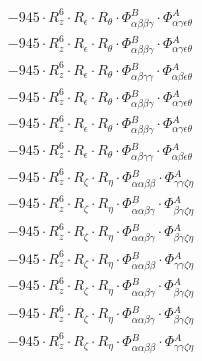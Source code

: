 \documentclass{article}
\begin{document}
\begin{subequations}
\begin{gather}
\begin{array}{c}
 \\[0.2em] 		 - 945 \cdot R_{z}^{6} \cdot R_{\epsilon{}} \cdot R_{\theta{}} \cdot \Phi{}^{B}_{\alpha{}\beta{}\beta{}\gamma{}} \cdot \Phi{}^{A}_{\alpha{}\gamma{}\epsilon{}\theta{}} 
 \\[0.2em] 		 - 945 \cdot R_{z}^{6} \cdot R_{\epsilon{}} \cdot R_{\theta{}} \cdot \Phi{}^{B}_{\alpha{}\beta{}\beta{}\gamma{}} \cdot \Phi{}^{A}_{\alpha{}\gamma{}\epsilon{}\theta{}} 
 \\[0.2em] 		 - 945 \cdot R_{z}^{6} \cdot R_{\epsilon{}} \cdot R_{\theta{}} \cdot \Phi{}^{B}_{\alpha{}\beta{}\gamma{}\gamma{}} \cdot \Phi{}^{A}_{\alpha{}\beta{}\epsilon{}\theta{}} 
 \\[0.2em] 		 - 945 \cdot R_{z}^{6} \cdot R_{\epsilon{}} \cdot R_{\theta{}} \cdot \Phi{}^{B}_{\alpha{}\beta{}\beta{}\gamma{}} \cdot \Phi{}^{A}_{\alpha{}\gamma{}\epsilon{}\theta{}} 
 \\[0.2em] 		 - 945 \cdot R_{z}^{6} \cdot R_{\epsilon{}} \cdot R_{\theta{}} \cdot \Phi{}^{B}_{\alpha{}\beta{}\beta{}\gamma{}} \cdot \Phi{}^{A}_{\alpha{}\gamma{}\epsilon{}\theta{}} 
 \\[0.2em] 		 - 945 \cdot R_{z}^{6} \cdot R_{\epsilon{}} \cdot R_{\theta{}} \cdot \Phi{}^{B}_{\alpha{}\beta{}\gamma{}\gamma{}} \cdot \Phi{}^{A}_{\alpha{}\beta{}\epsilon{}\theta{}} 
 \\[0.2em] 		 - 945 \cdot R_{z}^{6} \cdot R_{\zeta{}} \cdot R_{\eta{}} \cdot \Phi{}^{B}_{\alpha{}\alpha{}\beta{}\beta{}} \cdot \Phi{}^{A}_{\gamma{}\gamma{}\zeta{}\eta{}} 
 \\[0.2em] 		 - 945 \cdot R_{z}^{6} \cdot R_{\zeta{}} \cdot R_{\eta{}} \cdot \Phi{}^{B}_{\alpha{}\alpha{}\beta{}\gamma{}} \cdot \Phi{}^{A}_{\beta{}\gamma{}\zeta{}\eta{}} 
 \\[0.2em] 		 - 945 \cdot R_{z}^{6} \cdot R_{\zeta{}} \cdot R_{\eta{}} \cdot \Phi{}^{B}_{\alpha{}\alpha{}\beta{}\gamma{}} \cdot \Phi{}^{A}_{\beta{}\gamma{}\zeta{}\eta{}} 
 \\[0.2em] 		 - 945 \cdot R_{z}^{6} \cdot R_{\zeta{}} \cdot R_{\eta{}} \cdot \Phi{}^{B}_{\alpha{}\alpha{}\beta{}\beta{}} \cdot \Phi{}^{A}_{\gamma{}\gamma{}\zeta{}\eta{}} 
 \\[0.2em] 		 - 945 \cdot R_{z}^{6} \cdot R_{\zeta{}} \cdot R_{\eta{}} \cdot \Phi{}^{B}_{\alpha{}\alpha{}\beta{}\gamma{}} \cdot \Phi{}^{A}_{\beta{}\gamma{}\zeta{}\eta{}} 
 \\[0.2em] 		 - 945 \cdot R_{z}^{6} \cdot R_{\zeta{}} \cdot R_{\eta{}} \cdot \Phi{}^{B}_{\alpha{}\alpha{}\beta{}\gamma{}} \cdot \Phi{}^{A}_{\beta{}\gamma{}\zeta{}\eta{}} 
 \\[0.2em] 		 - 945 \cdot R_{z}^{6} \cdot R_{\zeta{}} \cdot R_{\eta{}} \cdot \Phi{}^{B}_{\alpha{}\alpha{}\beta{}\beta{}} \cdot \Phi{}^{A}_{\gamma{}\gamma{}\zeta{}\eta{}} 

\end{array}
\end{gather}
\end{subequations}
\end{document}
